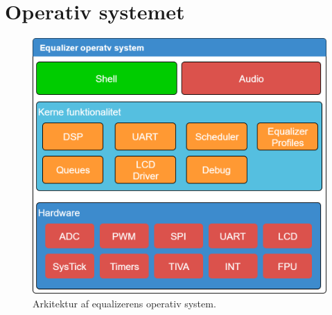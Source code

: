 \section{Operativ systemet}

\begin{figure}[h!]
	\centering
	\includegraphics[width=.8\textwidth]{billeder/eq_os.png}
	\caption{Arkitektur af equalizerens operativ system.}
	\label{fig:eq_os}
\end{figure}
\FloatBlock